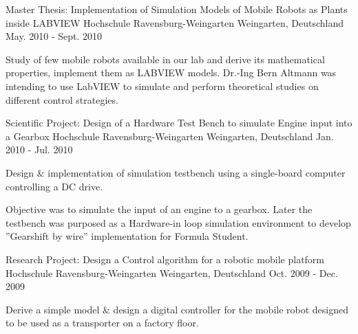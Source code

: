 

\begin{cventries}

  \cventry
    {Master Thesis: Implementation of Simulation Models of  Mobile Robots as Plants inside LABVIEW} %
    {Hochschule Ravensburg-Weingarten} %
    {Weingarten, Deutschland} %
    {May. 2010 - Sept. 2010} %
    {
      \begin{cvitems} %
        \item {Study of few mobile robots available in our lab and derive its mathematical properties, implement them as LABVIEW models. Dr.-Ing Bern Altmann was intending to use LabVIEW to simulate and perform theoretical studies on different control strategies.}
      \end{cvitems}
    }
    
  \cventry
    {Scientific Project: Design of a Hardware Test Bench to simulate Engine input into a Gearbox} %
    {Hochschule Ravensburg-Weingarten} %
    {Weingarten, Deutschland} %
    {Jan. 2010 - Jul. 2010} %
    {
      \begin{cvitems} %
        \item {Design \& implementation of simulation testbench using a single-board computer controlling a DC drive.}
        \item {Objective was to simulate the input of an engine to a gearbox. Later the testbench was purposed as a Hardware-in loop simulation environment to develop ”Gearshift by wire” implementation for Formula Student.}
      \end{cvitems}
    }
   
  \cventry
    {Research Project: Design a Control algorithm for a robotic mobile platform} %
    {Hochschule Ravensburg-Weingarten} %
    {Weingarten, Deutschland} %
    {Oct. 2009 - Dec. 2009} %
    {
      \begin{cvitems} %
      	\item {Derive a simple model \& design a digital controller for the mobile robot designed to be used as a transporter on a factory floor.}
      \end{cvitems}
    }
    

\end{cventries}

